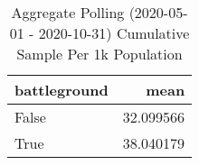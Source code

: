 \begin{table}
\centering
\caption{Aggregate Polling (2020-05-01 - 2020-10-31) Cumulative Sample Per 1k Population}
\begin{tabular}{lr}
\toprule
 battleground &       mean \\
\midrule
        False &  32.099566 \\
         True &  38.040179 \\
\bottomrule
\end{tabular}
\end{table}
